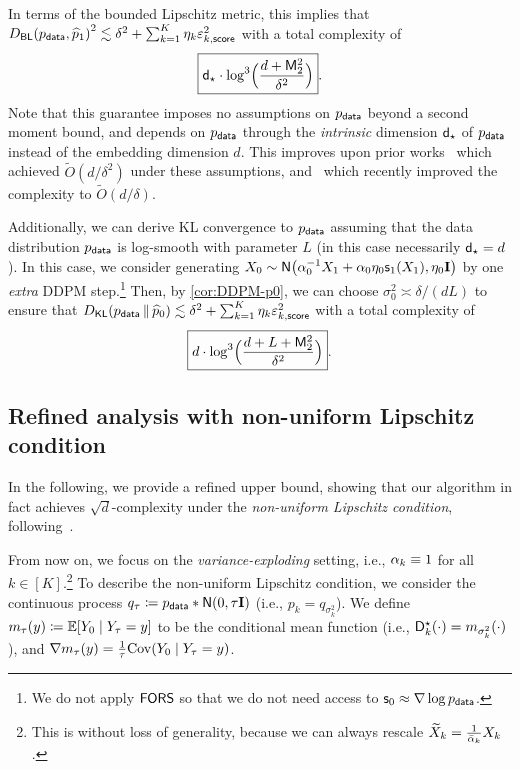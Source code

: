 In terms of the bounded Lipschitz metric, this implies that $\Dbl{\pdata}{\widehat p_1}^2 \lesssim \delta^2 + \sum_{k=1}^{K} \eta_k \epssct^2$ with a total complexity of %
\begin{align*}
    \boxed{\dstar\cdot \log^3\prn[\Big]{\frac{d+\mathsf M_2^2}{\delta^2}}}.
\end{align*}
Note that this guarantee imposes no assumptions on $\pdata$ beyond a second moment bound, and depends on $\pdata$ through the \emph{intrinsic} dimension $\dstar$ of $\pdata$ instead of the embedding dimension $d$.
This improves upon prior works~\citet{Ben+24Diffusion, ConDurSil25KLDiffusion} which achieved $\widetilde O(d/\delta^2)$ under these assumptions, and~\citet{LiYan25Diffusion, JaiZha26SharpKL} which recently improved the complexity to $\widetilde O(d/\delta)$.

Additionally, we can derive KL convergence to $\pdata$ assuming that the data distribution $\pdata$ is log-smooth with parameter $L$ (in this case necessarily $\dstar=d$). In this case, we consider generating $X_0\sim \normal{ \alp_0^{-1} \xr{1} + \alpha_0 \eta_0 \scf_{1}(\xr{1}), \eta_0 \Id }$ by one \emph{extra} DDPM step.\footnote{We do not apply $\AlgWSC$ so that we do not need access to $\scf_0\approx \nabla \log \pdata$.} Then, by \cref{cor:DDPM-p0}, we can choose $\sigma_0^2\asymp \delta/(dL)$ to ensure that $\Dkl{\pdata}{\widehat p_0} \lesssim \delta^2 + \sum_{k=1}^{K} \eta_k \epssct^2$ with a total complexity of
\begin{align*}
    \boxed{d\cdot \log^3\prn[\Big]{\frac{d+L+\mathsf M_2^2}{\delta^2}}}.
\end{align*} 


\subsection{Refined analysis with non-uniform Lipschitz condition}






In the following, we provide a refined upper bound, showing that our algorithm in fact achieves $\sqrt{d}$-complexity under the \emph{non-uniform Lipschitz condition}, following~\citet{jiao2024instance, jiao2025optimal}.

From now on, we focus on the \emph{variance-exploding} setting, i.e., $\alp_k\equiv 1$ for all $k\in [K]$.\footnote{This is without loss of generality, because we can always rescale $\wt{X}_k=\frac{1}{\alpbar_k} X_k$.}
To describe the non-uniform Lipschitz condition, we consider the continuous process $q_\tau\deq \pdata*\normal{0,\tau\Id}$ (i.e., $p_k=q_{\sigma_k^2}$). We define $m_\tau(y)\deq \En[Y_0\mid Y_\tau=y]$ to be the conditional mean function (i.e., $\Ds_k(\cdot)=m_{\sigma_k^2}(\cdot)$), and $\nabla m_\tau(y)=\frac{1}{\tau}\Cov(Y_0\mid Y_\tau=y)$.

